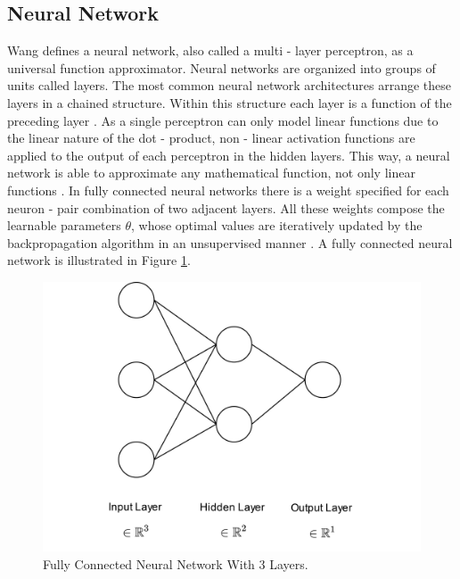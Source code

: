 \subsection{Neural Network}
Wang \cite{wang2003artificial} defines a neural network, also called a multi - layer perceptron, as a universal function approximator.
Neural networks are organized into groups of units called layers. The most common neural network architectures arrange these layers in a chained structure. Within this structure each layer is a function of the preceding layer \cite{zou2008overview}.
As a single perceptron can only model linear functions due to the linear nature of the dot - product, non - linear activation functions are applied to the output of each perceptron in the hidden layers. This way, a neural network is able to approximate any mathematical function, not only linear functions \cite{zou2008overview}. In fully connected neural networks there is a weight specified for each neuron - pair combination of two adjacent layers. All these weights compose the learnable parameters $\theta$, whose optimal values are iteratively updated by the backpropagation algorithm in an unsupervised manner \cite{rumelhart1986learning}. A fully connected neural network is illustrated in Figure \ref{fig:nn}.

\begin{figure}[ht]
    \centering
    \includegraphics[width=1\textwidth]{images/nn.jpg}
    \caption{Fully Connected Neural Network With $3$ Layers.}
    \label{fig:nn}
\end{figure}

